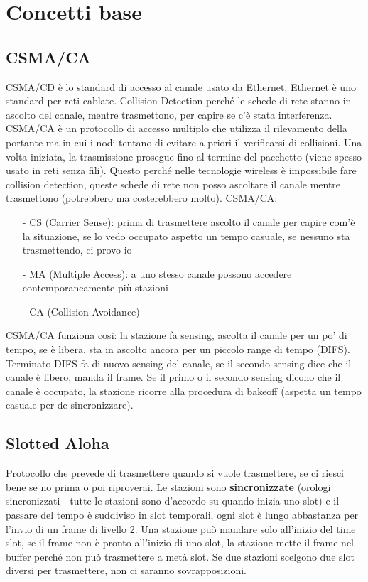 \documentclass[12pt,italian]{report}
\begin{document}
\section{Concetti base}

\subsection{CSMA/CA}
CSMA/CD è lo standard di accesso al canale usato da Ethernet, Ethernet è uno standard per reti cablate. Collision Detection perché le schede di rete stanno in ascolto del canale, mentre trasmettono, per capire se c'è stata interferenza. CSMA/CA è un protocollo di accesso multiplo che utilizza il rilevamento della portante ma in cui i nodi tentano di evitare a priori il verificarsi di collisioni. Una volta iniziata, la trasmissione prosegue fino al termine del pacchetto (viene spesso usato in reti senza fili). Questo perché nelle tecnologie wireless è impossibile fare collision detection, queste schede di rete non posso ascoltare il canale mentre trasmettono (potrebbero ma costerebbero molto).
\bigbreak
\noindent CSMA/CA:
\begin{itemize}
    \item [-] CS (Carrier Sense): prima di trasmettere ascolto il canale per capire com'è la situazione, se lo vedo occupato aspetto un tempo casuale, se nessuno sta trasmettendo, ci provo io
    \item [-] MA (Multiple Access): a uno stesso canale possono accedere contemporaneamente più stazioni
    \item [-] CA (Collision Avoidance)
\end{itemize}

\noindent CSMA/CA funziona così: la stazione fa sensing, ascolta il canale per un po' di tempo, se è libera, sta in ascolto ancora per un piccolo range di tempo (DIFS). Terminato DIFS fa di nuovo sensing del canale, se il secondo sensing dice che il canale è libero, manda il frame. Se il primo o il secondo sensing dicono che il canale è occupato, la stazione ricorre alla procedura di bakeoff (aspetta un tempo casuale per de-sincronizzare). 

\subsection{Slotted Aloha}
Protocollo che prevede di trasmettere quando si vuole trasmettere, se ci riesci bene se no prima o poi riproverai. Le stazioni sono \textbf{sincronizzate} (orologi sincronizzati - tutte le stazioni sono d'accordo su quando inizia uno slot) e il passare del tempo è suddiviso in slot temporali, ogni slot è lungo abbastanza per l'invio di un frame di livello 2. Una stazione può mandare solo all'inizio del time slot, se il frame non è pronto all'inizio di uno slot, la stazione mette il frame nel buffer perché non può trasmettere a metà slot. Se due stazioni scelgono due slot diversi per trasmettere, non ci saranno sovrapposizioni. 
\end{document}
